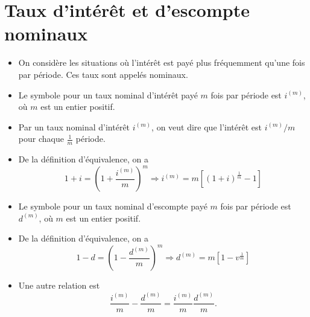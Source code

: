 \section{Taux d'intérêt et d'escompte nominaux}

\begin{itemize}
	\item On considère les situations où l'intérêt est payé plus fréquemment qu'une fois par période. Ces taux sont appelés nominaux.
	\item Le symbole pour un taux nominal d'intérêt payé $m$ fois par période est $i^{(m)}$, où $m$ est un entier positif. 
	\item Par un taux nominal d'intérêt $i^{(m)}$, on veut dire que l'intérêt est $i^{(m)}/m$ pour chaque $\frac{1}{m}$ période. 
	\item De la définition d'équivalence, on a 
	$$1 + i = \left(1 + \frac{i^{(m)}}{m}\right)^m \Rightarrow i^{(m)} = m\left[(1 + i)^{\frac{1}{m}} - 1\right]$$
	\item Le symbole pour un taux nominal d'escompte payé $m$ fois par période est $d^{(m)}$, où $m$ est un entier positif. 
	\item De la définition d'équivalence, on a 
	$$1 - d = \left(1 - \frac{d^{(m)}}{m}\right)^m \Rightarrow d^{(m)} = m\left[1 - v^{\frac{1}{m}}\right]$$
	\item Une autre relation est 
	$$\frac{i^{(m)}}{m} - \frac{d^{(m)}}{m} = \frac{i^{(m)}}{m} \frac{d^{(m)}}{m}.$$
\end{itemize}








